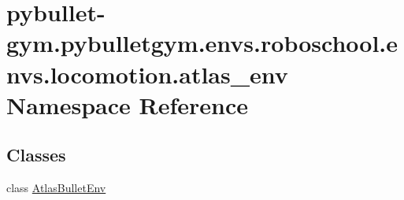 \hypertarget{namespacepybullet-gym_1_1pybulletgym_1_1envs_1_1roboschool_1_1envs_1_1locomotion_1_1atlas__env}{}\section{pybullet-\/gym.pybulletgym.\+envs.\+roboschool.\+envs.\+locomotion.\+atlas\+\_\+env Namespace Reference}
\label{namespacepybullet-gym_1_1pybulletgym_1_1envs_1_1roboschool_1_1envs_1_1locomotion_1_1atlas__env}
\subsection*{Classes}
\begin{DoxyCompactItemize}
\item 
class \hyperlink{classpybullet-gym_1_1pybulletgym_1_1envs_1_1roboschool_1_1envs_1_1locomotion_1_1atlas__env_1_1_atlas_bullet_env}{Atlas\+Bullet\+Env}
\end{DoxyCompactItemize}
